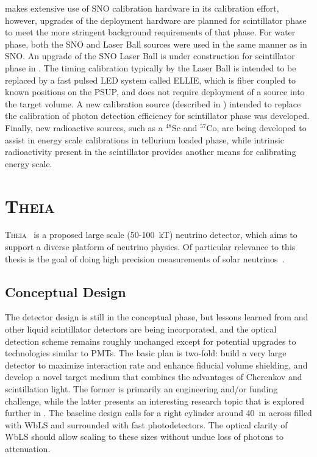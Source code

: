 {\snop} makes extensive use of SNO calibration hardware in its calibration effort, however, upgrades of the deployment hardware are planned for scintillator phase to meet the more stringent background requirements of that phase.
For water phase, both the SNO \N and Laser Ball sources were used in the same manner as in SNO.
An upgrade of the SNO Laser Ball is under construction for scintillator phase in {\snop}.
The timing calibration typically by the Laser Ball is intended to be replaced by a fast pulsed LED system called ELLIE, which is fiber coupled to known positions on the PSUP, and does not require deployment of a source into the target volume.
A new calibration source (described in ) intended to replace the \N calibration of photon detection efficiency for scintillator phase was developed.
Finally, new radioactive sources, such as a $^{48}$Sc and $^{57}$Co, are being developed to assist in energy scale calibrations in tellurium loaded phase, while intrinsic radioactivity present in the scintillator provides another means for calibrating energy scale.

\section{\textsc{Theia}}

\textsc{Theia}~\cite{asdc_paper} is a proposed large scale (50-100~kT) neutrino detector, which aims to support a diverse platform of neutrino physics. 
Of particular relevance to this thesis is the goal of doing high precision measurements of solar neutrinos~\cite{theia_solar}.

\subsection{Conceptual Design}
The detector design is still in the conceptual phase, but lessons learned from {\snop} and other liquid scintillator detectors are being incorporated, and the optical detection scheme remains roughly unchanged except for potential upgrades to technologies similar to PMTs.
The basic plan is two-fold: build a very large detector to maximize interaction rate and enhance fiducial volume shielding, and develop a novel target medium that combines the advantages of Cherenkov and scintillation light.
The former is primarily an engineering and/or funding challenge, while the latter presents an interesting research topic that is explored further in .
The baseline design calls for a right cylinder around 40~m across filled with WbLS and surrounded with fast photodetectors.
The optical clarity of WbLS should allow scaling to these sizes without undue loss of photons to attenuation.

